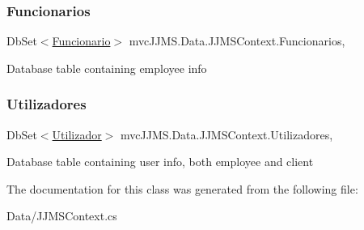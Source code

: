 \subsubsection{\texorpdfstring{Funcionarios}{Funcionarios}}
{\footnotesize\ttfamily Db\+Set$<$\mbox{\hyperlink{classmvc_j_j_m_s_1_1_models_1_1_funcionario}{Funcionario}}$>$ mvc\+J\+J\+M\+S.\+Data.\+J\+J\+M\+S\+Context.\+Funcionarios\hspace{0.3cm}{\ttfamily [get]}, {\ttfamily [set]}}



Database table containing employee info 

\mbox{\label{classmvc_j_j_m_s_1_1_data_1_1_j_j_m_s_context_a6c5c99292b7657f90a4b24d9da67e4ed}} 
\subsubsection{\texorpdfstring{Utilizadores}{Utilizadores}}
{\footnotesize\ttfamily Db\+Set$<$\mbox{\hyperlink{classmvc_j_j_m_s_1_1_models_1_1_utilizador}{Utilizador}}$>$ mvc\+J\+J\+M\+S.\+Data.\+J\+J\+M\+S\+Context.\+Utilizadores\hspace{0.3cm}{\ttfamily [get]}, {\ttfamily [set]}}



Database table containing user info, both employee and client 



The documentation for this class was generated from the following file\+:\begin{DoxyCompactItemize}
\item 
Data/J\+J\+M\+S\+Context.\+cs\end{DoxyCompactItemize}
